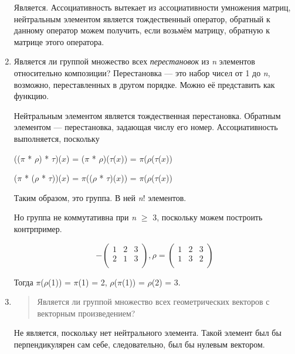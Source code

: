 \documentclass[12pt]{article}
\begin{document}
\begin{enumerate}
          Является. Ассоциативность вытекает из ассоциативности умножения матриц,
          нейтральным элементом является тождественный оператор, обратный к
          данному оператор можем получить, если возьмём матрицу, обратную к
          матрице этого оператора.

    \item
          Является ли группой множество всех \emph{перестановок} из \emph{n}
          элементов относительно композиции? Перестановка --- это набор чисел от
          1 до \emph{n}, возможно, переставленных в другом порядке. Можно её
          представить как функцию.

          Нейтральным элементом является тождественная перестановка. Обратным
          элементом --- перестановка, задающая числу его номер. Ассоциативность
          выполняется, поскольку

          (($\pi$ * $\rho$) * $\tau$)($x$) = ($\pi$ * $\rho$)($\tau$($x$)) = $\pi$($\rho$($\tau$($x$))

          ($\pi$ * ($\rho$ * $\tau$))($x$) = $\pi$(($\rho$ * $\tau$)($x$)) = $\pi$($\rho$($\tau$($x$))

          Таким образом, это группа. В ней \emph{n}! элементов.

          Но группа не коммутативна при \emph{n} $\geq$ 3, поскольку можем построить
          контрпример.

          \[- \begin{pmatrix}
                  1 & 2 & 3 \\
                  2 & 1 & 3 \\
              \end{pmatrix},\rho = (\begin{matrix}
                  1 & 2 & 3 \\
                  1 & 3 & 2 \\
              \end{matrix})\]

          Тогда $\pi$($\rho$(1)) = $\pi$(1) = 2, $\rho$($\pi$(1)) = $\rho$(2) = 3.

    \item
          \begin{quote}
              Является ли группой множество всех геометрических векторов с векторным
              произведением?
          \end{quote}

          Не является, поскольку нет нейтрального элемента. Такой элемент был бы
          перпендикулярен сам себе, следовательно, был бы нулевым вектором.


\end{enumerate}
\end{document}
